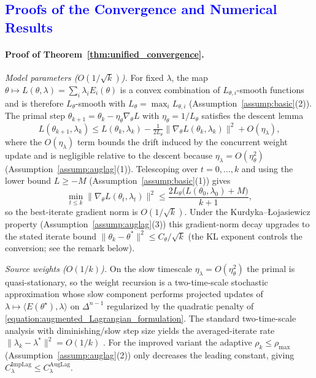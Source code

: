 \documentclass[preprint,12pt,authoryear]{elsarticle}
\begin{document}
\subsection{\textcolor{blue}{Proofs of the Convergence and Numerical Results}}

{\color{blue}
\paragraph{Proof of Theorem~\ref{thm:unified_convergence}.}
\emph{Model parameters ($O(1/\sqrt{k})$).} For fixed $\lambda$, the map $\theta\mapsto L(\theta,\lambda)=\sum_i\lambda_i E_i(\theta)$ is a convex combination of $L_{\theta,i}$-smooth functions and is therefore $L_\theta$-smooth with $L_\theta=\max_i L_{\theta,i}$ (Assumption~\ref{assump:basic}(2)). The primal step $\theta_{k+1}=\theta_k-\eta_\theta\nabla_\theta L$ with $\eta_\theta=1/L_\theta$ satisfies the descent lemma
\[
L(\theta_{k+1},\lambda_k)\le L(\theta_k,\lambda_k)-\tfrac{1}{2L_\theta}\|\nabla_\theta L(\theta_k,\lambda_k)\|^2+O(\eta_\lambda),
\]
where the $O(\eta_\lambda)$ term bounds the drift induced by the concurrent weight update and is negligible relative to the descent because $\eta_\lambda=O(\eta_\theta^2)$ (Assumption~\ref{assump:auglag}(1)). Telescoping over $t=0,\dots,k$ and using the lower bound $L\ge -M$ (Assumption~\ref{assump:basic}(1)) gives
\[
\min_{t\le k}\|\nabla_\theta L(\theta_t,\lambda_t)\|^2\le\frac{2L_\theta\big(L(\theta_0,\lambda_0)+M\big)}{k+1},
\]
so the best-iterate gradient norm is $O(1/\sqrt{k})$. Under the Kurdyka--{\L}ojasiewicz property (Assumption~\ref{assump:auglag}(3)) this gradient-norm decay upgrades to the stated iterate bound $\|\theta_k-\theta^*\|^2\le C_\theta/\sqrt{k}$ (the KL exponent controls the conversion; see the remark below).

\emph{Source weights ($O(1/k)$).} On the slow timescale $\eta_\lambda=O(\eta_\theta^2)$ the primal is quasi-stationary, so the weight recursion is a two-time-scale stochastic approximation whose slow component performs projected updates of $\lambda\mapsto\langle E(\theta^\star),\lambda\rangle$ on $\Delta^{n-1}$ regularized by the quadratic penalty of \eqref{equation:augmented_Lagrangian_formulation}. The standard two-time-scale analysis with diminishing/slow step size yields the averaged-iterate rate $\|\lambda_k-\lambda^*\|^2=O(1/k)$ \cite{borkar2008stochastic,konda2004convergence,Marion2023Leveraging}. For the improved variant the adaptive $\rho_k\le\rho_{\max}$ (Assumption~\ref{assump:auglag}(2)) only decreases the leading constant, giving $C_\lambda^{\mathrm{ImpLag}}\le C_\lambda^{\mathrm{AugLag}}$.

}
\end{document}

